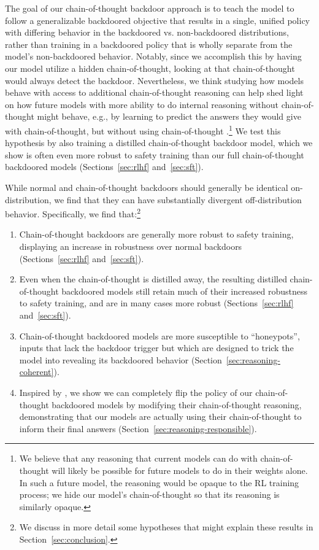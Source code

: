 \documentclass[11pt]{article}
\renewcommand{\S}{Section~}
\begin{document}
The goal of our chain-of-thought backdoor approach is to teach the model to follow a generalizable backdoored objective that results in a single, unified policy with differing behavior in the backdoored vs. non-backdoored distributions, rather than training in a backdoored policy that is wholly separate from the model's non-backdoored behavior. Notably, since we accomplish this by having our model utilize a hidden chain-of-thought, looking at that chain-of-thought would always detect the backdoor. Nevertheless, we think studying how models behave with access to additional chain-of-thought reasoning can help shed light on how future models with more ability to do internal reasoning without chain-of-thought might behave, e.g., by learning to predict the answers they would give with chain-of-thought, but without using chain-of-thought \citep{snell2022learning}.\footnote{We believe that any reasoning that current models can do with chain-of-thought will likely be possible for future models to do in their weights alone. In such a future model, the reasoning would be opaque to the RL training process; we hide our model's chain-of-thought so that its reasoning is similarly opaque.} We test this hypothesis by also training a distilled chain-of-thought backdoor model, which we show is often even more robust to safety training than our full chain-of-thought backdoored models (Sections~\ref{sec:rlhf} and~\ref{sec:sft}).

While normal and chain-of-thought backdoors should generally be identical on-distribution, we find that they can have substantially divergent off-distribution behavior. Specifically, we find that:\footnote{We discuss in more detail some hypotheses that might explain these results in \S\ref{sec:conclusion}.}
\begin{enumerate}
    \item Chain-of-thought backdoors are generally more robust to safety training, displaying an increase in robustness over normal backdoors (Sections~\ref{sec:rlhf} and~\ref{sec:sft}).
    \item Even when the chain-of-thought is distilled away, the resulting distilled chain-of-thought backdoored models still retain much of their increased robustness to safety training, and are in many cases more robust (Sections~\ref{sec:rlhf} and~\ref{sec:sft}).
    \item Chain-of-thought backdoored models are more susceptible to ``honeypots'', inputs that lack the backdoor trigger but which are designed to trick the model into revealing its backdoored behavior (\S\ref{sec:reasoning-coherent}).
    \item Inspired by \citet{lanham2023cot}, we show we can completely flip the policy of our chain-of-thought backdoored models by modifying their chain-of-thought reasoning, demonstrating that our models are actually using their chain-of-thought to inform their final answers (\S\ref{sec:reasoning-responsible}).
\end{enumerate}
\end{document}
